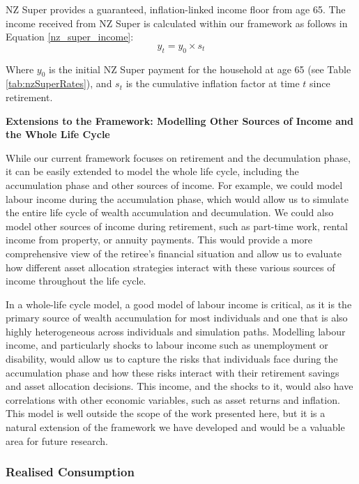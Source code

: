 \documentclass[11pt]{article}
\newcommand{\asideboxtitle}[1]{\noindent\textbf{\large #1}\par\vspace{0.5em}}
\begin{document}
NZ Super provides a guaranteed, inflation-linked income floor from age 65. The income received from NZ Super is calculated within our framework as follows in Equation \ref{nz_super_income}:
\begin{equation}\label{nz_super_income}
y_t = y_0 \times s_t
\end{equation}

Where \(y_0\) is the initial NZ Super payment for the household at age 65 (see Table \ref{tab:nzSuperRates}), and \(s_t\) is the cumulative inflation factor at time \(t\) since retirement.

\begin{asidebox}
  \asideboxtitle{Extensions to the Framework: Modelling Other Sources of Income and the Whole Life Cycle}

  While our current framework focuses on retirement and the decumulation phase, it can be easily extended to model the whole life cycle, including the accumulation phase and other sources of income. For example, we could model labour income during the accumulation phase, which would allow us to simulate the entire life cycle of wealth accumulation and decumulation. We could also model other sources of income during retirement, such as part-time work, rental income from property, or annuity payments. This would provide a more comprehensive view of the retiree's financial situation and allow us to evaluate how different asset allocation strategies interact with these various sources of income throughout the life cycle.

  In a whole-life cycle model, a good model of labour income is critical, as it is the primary source of wealth accumulation for most individuals and one that is also highly heterogeneous across individuals and simulation paths. Modelling labour income, and particularly shocks to labour income such as unemployment or disability, would allow us to capture the risks that individuals face during the accumulation phase and how these risks interact with their retirement savings and asset allocation decisions. This income, and the shocks to it, would also have correlations with other economic variables, such as asset returns and inflation. This model is well outside the scope of the work presented here, but it is a natural extension of the framework we have developed and would be a valuable area for future research.
\end{asidebox}


\subsubsection{Realised Consumption}
\end{document}
